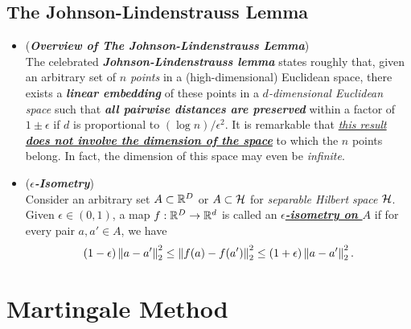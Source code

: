 \documentclass[11pt]{article}
\begin{document}
\subsection{The Johnson-Lindenstrauss Lemma}
\begin{itemize}
\item \begin{remark} (\textbf{\emph{Overview of The Johnson-Lindenstrauss Lemma}})\\
The celebrated \emph{\textbf{Johnson-Lindenstrauss lemma}} states roughly that, given an arbitrary set of \emph{$n$ points} in a (high-dimensional) Euclidean space, there exists a \emph{\textbf{linear embedding}} of these points in a \emph{$d$-dimensional Euclidean space} such that \emph{\textbf{all pairwise distances are preserved}} within a factor of $1 \pm \epsilon$  if $d$ is proportional to $(\log n)/\epsilon^2$. It is remarkable that \underline{\emph{this result \textbf{does not involve the dimension of the space}}} to which the $n$ points belong. In fact, the dimension of this space may even be \emph{infinite}.
\end{remark}

\item \begin{definition}(\textbf{\emph{$\epsilon$-Isometry}})\\
Consider an arbitrary set  $A \subset {\mathbb R}^D$ or $A \subset {\mathcal H}$ for \emph{separable Hilbert space} ${\mathcal H}$. Given $\epsilon \in (0, 1)$, a map $f : {\mathbb R}^D \to {\mathbb R}^d$ is called an \underline{\emph{\textbf{$\epsilon$-isometry on $A$}}} if for every pair $a, a' \in A$, we have
\begin{align*}
(1 - \epsilon)\left\|a - a'\right\|_{2}^2 \le \left\|f(a) - f(a')\right\|_{2}^2 \le (1 + \epsilon)\left\|a - a'\right\|_{2}^2.
\end{align*}
\end{definition}
\end{itemize}

\section{Martingale Method}
\end{document}
